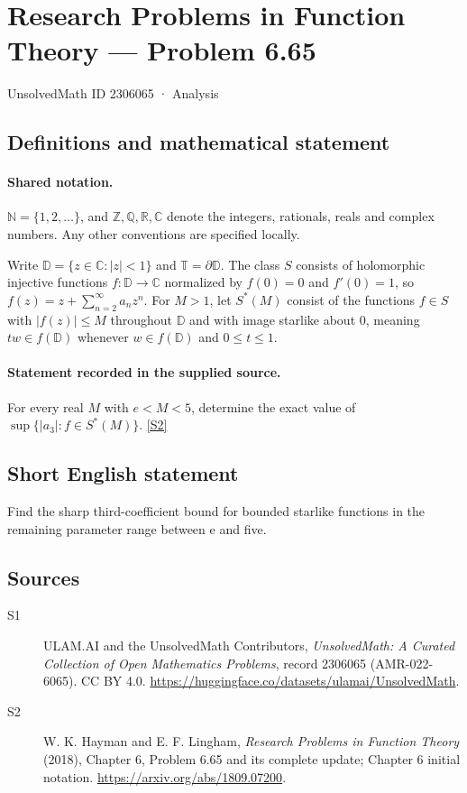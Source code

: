 \documentclass[11pt]{article}
\newcommand{\sref}[2]{\hyperlink{source:#1:#2}{[S#2]}}
\begin{document}
\setcounter{section}{2306064}
\section{Research Problems in Function Theory — Problem 6.65}\label{2306065}
{\small\sffamily UnsolvedMath ID 2306065 · Analysis}
\subsection{Definitions and mathematical statement}

\paragraph{Shared notation.}$\mathbb N=\{1,2,\ldots\}$, and $\mathbb Z,\mathbb Q,\mathbb R,\mathbb C$ denote the integers, rationals, reals and complex numbers. Any other conventions are specified locally.


Write $\mathbb D=\{z\in\mathbb C:|z|<1\}$ and $\mathbb T=\partial\mathbb D$. The class $S$ consists of holomorphic injective functions $f:\mathbb D\to\mathbb C$ normalized by $f(0)=0$ and $f'(0)=1$, so $f(z)=z+\sum_{n=2}^{\infty}a_nz^n$. For $M>1$, let $S^*(M)$ consist of the functions $f\in S$ with $|f(z)|\le M$ throughout $\mathbb D$ and with image starlike about $0$, meaning $tw\in f(\mathbb D)$ whenever $w\in f(\mathbb D)$ and $0\le t\le1$.
\paragraph{Statement recorded in the supplied source.}
For every real $M$ with $e<M<5$, determine the exact value of $\sup\{|a_3|:f\in S^*(M)\}$. \sref{2306065}{2}
\subsection{Short English statement}
Find the sharp third-coefficient bound for bounded starlike functions in the remaining parameter range between e and five.
\subsection{Sources}
\begin{description}
\item[\hypertarget{source:2306065:1}{S1}] ULAM.AI and the UnsolvedMath Contributors, \emph{UnsolvedMath: A Curated Collection of Open Mathematics Problems}, record 2306065 (AMR-022-6065). CC BY 4.0. \url{https://huggingface.co/datasets/ulamai/UnsolvedMath}.
\item[\hypertarget{source:2306065:2}{S2}] W. K. Hayman and E. F. Lingham, \emph{Research Problems in Function Theory} (2018), Chapter 6, Problem 6.65 and its complete update; Chapter 6 initial notation. \url{https://arxiv.org/abs/1809.07200}.
\end{description}
\label{end:2306065}
\end{document}
